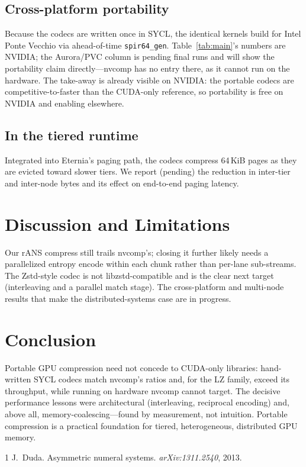 \documentclass[sigconf,review,anonymous]{acmart}
\begin{document}
\subsection{Cross-platform portability}
Because the codecs are written once in SYCL, the identical kernels build for
Intel Ponte Vecchio via ahead-of-time \texttt{spir64\_gen}. Table~\ref{tab:main}'s
numbers are NVIDIA; the Aurora/PVC column is pending final runs and will show the
portability claim directly---nvcomp has no entry there, as it cannot run on the
hardware. The take-away is already visible on NVIDIA: the portable codecs are
competitive-to-faster than the CUDA-only reference, so portability is free on
NVIDIA and enabling elsewhere.

\subsection{In the tiered runtime}
Integrated into Eternia's paging path, the codecs compress 64\,KiB pages as they
are evicted toward slower tiers. We report (pending) the reduction in inter-tier
and inter-node bytes and its effect on end-to-end paging latency.

\section{Discussion and Limitations}
Our rANS compress still trails nvcomp's; closing it further likely needs a
parallelized entropy encode within each chunk rather than per-lane sub-streams.
The Zstd-style codec is not libzstd-compatible and is the clear next target
(interleaving and a parallel match stage). The cross-platform and multi-node
results that make the distributed-systems case are in progress.

\section{Conclusion}
Portable GPU compression need not concede to CUDA-only libraries: hand-written
SYCL codecs match nvcomp's ratios and, for the LZ family, exceed its throughput,
while running on hardware nvcomp cannot target. The decisive performance lessons
were architectural (interleaving, reciprocal encoding) and, above all,
memory-coalescing---found by measurement, not intuition. Portable compression is
a practical foundation for tiered, heterogeneous, distributed GPU memory.


\begin{thebibliography}{1}
 J.~Duda. Asymmetric numeral systems. \emph{arXiv:1311.2540}, 2013.
\end{thebibliography}
\end{document}
